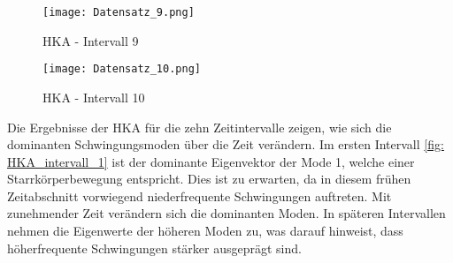         \begin{figure}[H]
            \centering
            \texttt{[image: Datensatz\_9.png]}
            \caption{HKA - Intervall 9}
            \label{fig: HKA_intervall_9}
        \end{figure}

        \begin{figure}[H]
            \centering
            \texttt{[image: Datensatz\_10.png]}
            \caption{HKA - Intervall 10}
            \label{fig: HKA_intervall_10}
        \end{figure}

        \noindent
        Die Ergebnisse der HKA für die zehn Zeitintervalle zeigen, wie sich die dominanten 
        Schwingungsmoden über die Zeit verändern. Im ersten Intervall \ref{fig: HKA_intervall_1} 
        ist der dominante Eigenvektor der Mode 1, welche einer Starrkörperbewegung entspricht. 
        Dies ist zu erwarten, da in diesem frühen Zeitabschnitt vorwiegend niederfrequente 
        Schwingungen auftreten. Mit zunehmender Zeit verändern sich die dominanten Moden. 
        In späteren Intervallen nehmen die Eigenwerte der höheren Moden zu, was darauf 
        hinweist, dass höherfrequente Schwingungen stärker ausgeprägt sind. 